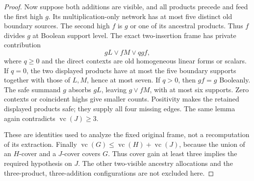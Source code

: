\documentclass[11pt]{article}
\newcommand{\vc}{\operatorname{vc}}
\theoremstyle{definition}
\theoremstyle{remark}
\begin{document}
\begin{proof}
Now suppose both additions are visible, and all products precede and feed
the first high $g$. Its multiplication-only network has at most five
distinct old boundary sources. The second high $f$ is $g$ or one of its
ancestral products. Thus $f$ divides $g$ at Boolean support level.
The exact two-insertion frame has private contribution
\[
 gL\vee fM\vee qgf,
\]
where $q\ge0$ and the direct contexts are old homogeneous linear forms
or scalars. If $q=0$, the two displayed products have at most the five
boundary supports together with those of $L,M$, hence at most seven.
If $q>0$, then $gf=g$ Booleanly. The safe summand $g$ absorbs $gL$,
leaving $g\vee fM$, with at most six supports. Zero contexts or coincident
highs give smaller counts. Positivity makes the retained displayed products
safe; they supply all four missing edges. The same lemma again contradicts
$\vc(J)\ge3$.

These are identities used to analyze the fixed original frame, not a
recomputation of its extraction. Finally
$\vc(G)\le\vc(H)+\vc(J)$, because the union of an $H$-cover and a
$J$-cover covers $G$. Thus cover gain at least three implies the required
hypothesis on $J$. The other two-visible ancestry allocations and the
three-product, three-addition configurations are not excluded here.
\end{proof}
\end{document}

